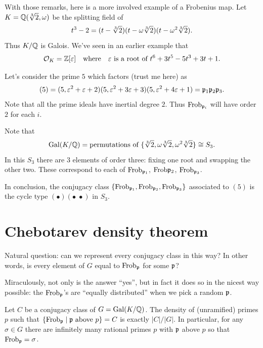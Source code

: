 \begin{example}
	With those remarks, here is a more involved example of a Frobenius map.
	Let $K = \mathbb Q(\sqrt[3]{2}, \omega)$ be the splitting field of 
	\[ t^3-2 = (t-\sqrt[3]{2})(t-\omega\sqrt[3]{2})(t-\omega^2\sqrt[3]{2}). \]
	Thus $K/\mathbb Q$ is Galois.
	We've seen in an earlier example that
	\[ \mathcal O_K = \mathbb Z[\varepsilon] \quad\text{where}\quad \varepsilon \text { is a root of } t^6+3t^5-5t^3+3t+1. \]

	Let's consider the prime $5$ which factors (trust me here) as
	\[ (5) = (5, \varepsilon^2+\varepsilon+2)(5, \varepsilon^2+3\varepsilon+3)(5, \varepsilon^2+4\varepsilon+1)
		= \mathfrak p_1 \mathfrak p_2 \mathfrak p_3. \]
	Note that all the prime ideals have inertial degree $2$.
	Thus $\mathrm{Frob}_{\mathfrak p_i}$ will have order $2$ for each $i$.

	Note that 
	\[ \operatorname{Gal}(K/\mathbb Q) =
		\text{permutations of } \{\sqrt[3]{2},\omega\sqrt[3]{2},\omega^2\sqrt[3]{2}\}
		\cong S_3.  \]
	In this $S_3$ there are $3$ elements of order three:
	fixing one root and swapping the other two.
	These correspond to each of $\mathrm{Frob}_{\mathfrak p_1}$, $\mathrm{Frob}{\mathfrak p_2}$, $\mathrm{Frob}_{\mathfrak p_3}$.

	In conclusion, the conjugacy class
	$\left\{ \mathrm{Frob}_{\mathfrak p_1}, \mathrm{Frob}_{\mathfrak p_2}, \mathrm{Frob}_{\mathfrak p_3} \right\}$
	associated to $(5)$ is the
	cycle type $(\bullet)(\bullet \; \bullet)$ in $S_3$.
\end{example}


\section{Chebotarev density theorem}
Natural question: can we represent every conjugacy class in this way?
In other words, is every element of $G$ equal to $\mathrm{Frob}_\mathfrak p$ for some $\mathfrak p$?

Miraculously, not only is the answer ``yes'', but in fact it does so in the nicest way possible:
the $\mathrm{Frob}_\mathfrak p$'s are ``equally distributed'' when we pick a random $\mathfrak p$.
\begin{theorem}
	Let $C$ be a conjugacy class of $G = \operatorname{Gal}(K/\mathbb Q)$.
	The density of (unramified) primes $p$ such that $\{ \mathrm{Frob}_\mathfrak p \mid \mathfrak p \text{ above } p \} = C$
	is exactly $\left\lvert C \right\rvert / \left\lvert G \right\rvert$.
	In particular, for any $\sigma \in G$ there are infinitely many rational primes $p$
	with $\mathfrak p$ above $p$ so that $\mathrm{Frob}_{\mathfrak p} = \sigma$.
\end{theorem}



